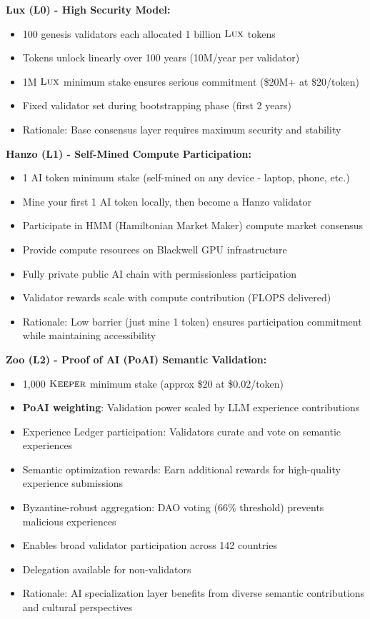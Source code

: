 \textbf{Lux (L0) - High Security Model:}
\begin{itemize}
\item 100 genesis validators each allocated 1 billion $\textsc{Lux}$ tokens
\item Tokens unlock linearly over 100 years (10M/year per validator)
\item 1M $\textsc{Lux}$ minimum stake ensures serious commitment (\$20M+ at \$20/token)
\item Fixed validator set during bootstrapping phase (first 2 years)
\item Rationale: Base consensus layer requires maximum security and stability
\end{itemize}

\textbf{Hanzo (L1) - Self-Mined Compute Participation:}
\begin{itemize}
\item 1 AI token minimum stake (self-mined on any device - laptop, phone, etc.)
\item Mine your first 1 AI token locally, then become a Hanzo validator
\item Participate in HMM (Hamiltonian Market Maker) compute market consensus
\item Provide compute resources on Blackwell GPU infrastructure
\item Fully private public AI chain with permissionless participation
\item Validator rewards scale with compute contribution (FLOPS delivered)
\item Rationale: Low barrier (just mine 1 token) ensures participation commitment while maintaining accessibility
\end{itemize}

\textbf{Zoo (L2) - Proof of AI (PoAI) Semantic Validation:}
\begin{itemize}
\item 1,000 $\textsc{Keeper}$ minimum stake (approx \$20 at \$0.02/token)
\item \textbf{PoAI weighting}: Validation power scaled by LLM experience contributions
\item Experience Ledger participation: Validators curate and vote on semantic experiences
\item Semantic optimization rewards: Earn additional rewards for high-quality experience submissions
\item Byzantine-robust aggregation: DAO voting (66\% threshold) prevents malicious experiences
\item Enables broad validator participation across 142 countries
\item Delegation available for non-validators
\item Rationale: AI specialization layer benefits from diverse semantic contributions and cultural perspectives
\end{itemize}


